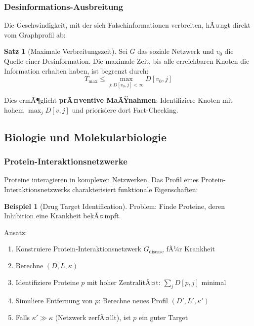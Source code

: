 ﻿\documentclass[a4paper,12pt]{article}
\theoremstyle{definition}
\newtheorem{beispiel}{Beispiel}
\newtheorem{satz}{Satz}
\begin{document}
	\subsubsection{Desinformations-Ausbreitung}
	
	Die Geschwindigkeit, mit der sich Falschinformationen verbreiten, hÃ¤ngt direkt vom Graphprofil ab:
	
	\begin{satz}[Maximale Verbreitungszeit]
		Sei $G$ das soziale Netzwerk und $v_0$ die Quelle einer Desinformation. Die maximale Zeit, bis alle erreichbaren Knoten die Information erhalten haben, ist begrenzt durch:
		\[
		T_{\max} \leq \max_{j: D[v_0,j] < \infty} D[v_0, j]
		\]
	\end{satz}
	
	Dies ermÃ¶glicht \textbf{prÃ¤ventive MaÃŸnahmen}: Identifiziere Knoten mit hohem $\max_j D[v,j]$ und priorisiere dort Fact-Checking.
	
	\subsection{Biologie und Molekularbiologie}
	
	\subsubsection{Protein-Interaktionsnetzwerke}
	
	Proteine interagieren in komplexen Netzwerken. Das Profil eines Protein-Interaktions\-netzwerks charakterisiert funktionale Eigenschaften:
	
	\begin{beispiel}[Drug Target Identification]
		Problem: Finde Proteine, deren Inhibition eine Krankheit bekÃ¤mpft.
		
		Ansatz:
		\begin{enumerate}
			\item Konstruiere Protein-Interaktionsnetzwerk $G_{\text{disease}}$ fÃ¼r Krankheit
			\item Berechne $(D, L, \kappa)$
			\item Identifiziere Proteine $p$ mit hoher ZentralitÃ¤t: $\sum_j D[p,j]$ minimal
			\item Simuliere Entfernung von $p$: Berechne neues Profil $(D', L', \kappa')$
			\item Falls $\kappa' \gg \kappa$ (Netzwerk zerfÃ¤llt), ist $p$ ein guter Target
		\end{enumerate}
	\end{beispiel}
	
\end{document}
